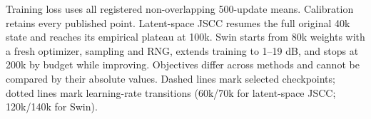 Training loss uses all registered non-overlapping 500-update means. Calibration retains every published point. Latent-space JSCC resumes the full original 40k state and reaches its empirical plateau at 100k. Swin starts from 80k weights with a fresh optimizer, sampling and RNG, extends training to 1--19 dB, and stops at 200k by budget while improving. Objectives differ across methods and cannot be compared by their absolute values. Dashed lines mark selected checkpoints; dotted lines mark learning-rate transitions (60k/70k for latent-space JSCC; 120k/140k for Swin).
